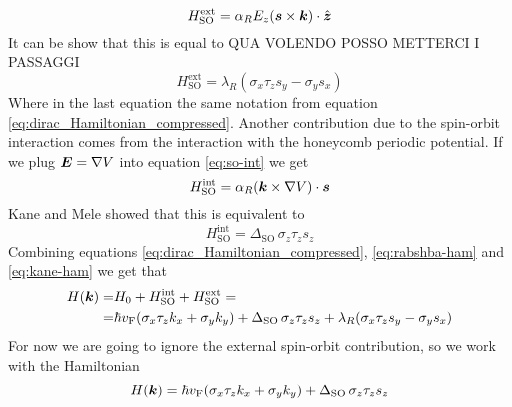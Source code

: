 \begin{equation}
    H_\textrm{SO}^\textrm{ext}=
    \alpha_R E_z(\boldsymbol{s} \times \boldsymbol{k})\cdot \hat{\boldsymbol{z}}
\end{equation}
It can be show that this is equal to \cite{kane2005quantum} QUA VOLENDO POSSO METTERCI I PASSAGGI
\begin{equation}
    H_\textrm{SO}^\textrm{ext}=
    \lambda_R (\sigma_x\tau_zs_y-\sigma_ys_x)
    \label{eq:rabshba-ham}
\end{equation}
Where in the last equation the same notation from equation \ref{eq:dirac_Hamiltonian_compressed}.
Another contribution due to the spin-orbit interaction comes from the interaction with the honeycomb periodic potential. If we plug $\boldsymbol{E}=\nabla V$ into equation \ref{eq:so-int} we get
\begin{equation}
    H_\textrm{SO}^\textrm{int}=\alpha_R(\boldsymbol{k}\times \nabla V)\cdot \boldsymbol{s}
\end{equation}
Kane and Mele \cite{kane2005quantum} showed that this is equivalent to 
\begin{equation}
    H_\textrm{SO}^\textrm{int}=\Delta_\textrm{SO}\,\sigma_z\tau_zs_z
    \label{eq:kane-ham}
\end{equation}
Combining equations \ref{eq:dirac_Hamiltonian_compressed}, \ref{eq:rabshba-ham} and \ref{eq:kane-ham} we get that
\begin{equation}
    \begin{split}
        H(\boldsymbol{k})=&H_0+H_\textrm{SO}^\textrm{int}+H_\textrm{SO}^\textrm{ext}=\\
        =&\hbar v_\textrm{F}(\sigma_x\tau_zk_x+\sigma_yk_y)+
        \Delta_\textrm{SO}\,\sigma_z\tau_zs_z +
        \lambda_R (\sigma_x\tau_zs_y-\sigma_ys_x)
    \end{split}
\end{equation}
For now we are going to ignore the external spin-orbit contribution, so we work with the Hamiltonian
\begin{equation}
    H(\boldsymbol{k})=\hbar v_\textrm{F}(\sigma_x\tau_zk_x+\sigma_yk_y)+
    \Delta_\textrm{SO}\,\sigma_z\tau_zs_z
\end{equation}


